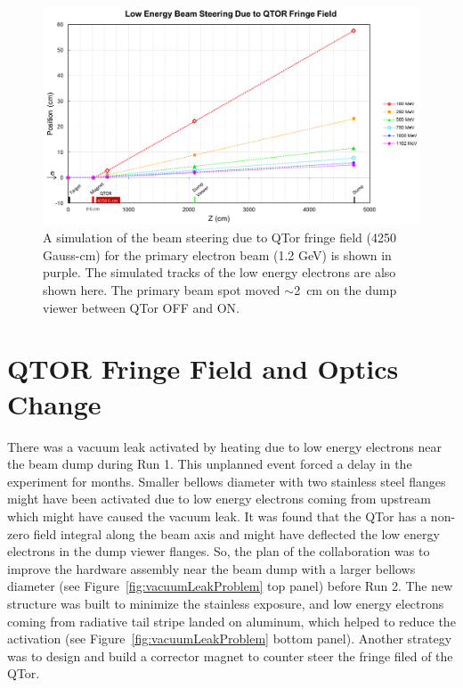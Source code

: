 \begin{singlespace}
\begin{figure}[!h]
	\begin{center}
		\includegraphics[width=15.0cm]{figures/qtor_allenergy_0Gcm}
	\end{center}
	\caption
		{A simulation of the beam steering due to QTor fringe field (4250 Gauss-cm) for the primary electron beam (1.2 GeV) is shown in purple. The simulated tracks of the low energy electrons are also shown here. The primary beam spot moved $\sim$2~cm on the dump viewer between QTor OFF and ON.}
		\label{fig:qtor_allenergy_0Gcm}
\end{figure}
\end{singlespace}


\section{QTOR Fringe Field and Optics Change}
\label{QTOR Fringe Field and Optics Change}

There was a vacuum leak activated by heating due to low energy electrons near the beam dump during Run 1.  This unplanned event forced a delay in the experiment for months. 
Smaller bellows diameter with two stainless steel flanges might have been activated due to low energy electrons coming from upstream which might have caused the vacuum leak. It was found that the QTor has a non-zero field integral along the beam axis and might have deflected the low energy electrons in the dump viewer flanges. So, the plan of the collaboration was to improve the hardware assembly near the beam dump with a larger bellows diameter (see Figure~\ref{fig:vacuumLeakProblem} top panel) before Run 2. The new structure was built to minimize the stainless exposure, and low energy electrons coming from radiative tail stripe landed on aluminum, which helped to reduce the activation (see Figure~\ref{fig:vacuumLeakProblem} bottom panel). Another strategy was to design and build a corrector magnet to counter steer the fringe filed of the QTor.

